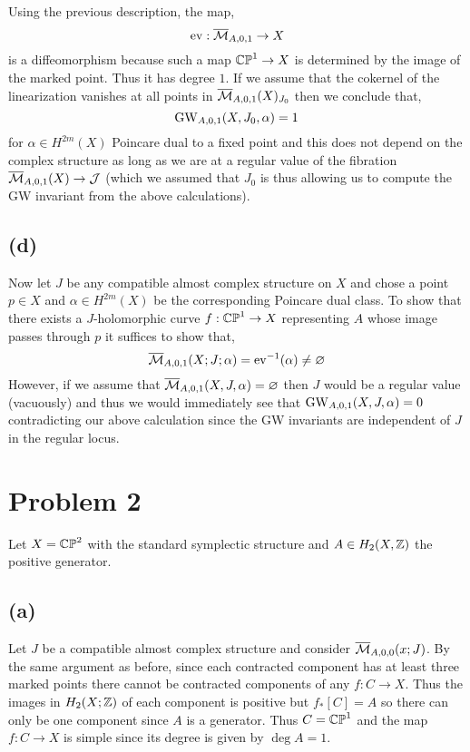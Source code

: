 \documentclass[12pt]{article}
\begin{document}
Using the previous description, the map,
\[ \mathrm{ev} : \overline{\mathcal{M}}_{A,0,1} \to X \]
is a diffeomorphism because such a map $\mathbb{CP}^1 \to X$ is determined by the image of the marked point. Thus it has degree $1$. If we assume that the cokernel of the linearization vanishes at all points in $\overline{\mathcal{M}}_{A,0,1}(X)_{J_0}$ then we conclude that,
\[ \mathrm{GW}_{A,0,1}(X, J_0, \alpha) = 1 \]
for $\alpha \in H^{2m}(X)$ Poincare dual to a fixed point and this does not depend on the complex structure as long as we are at a regular value of the fibration $\overline{\mathcal{M}}_{A,0,1}(X) \to \mathcal{J}$ (which we assumed that $J_0$ is thus allowing us to compute the GW invariant from the above calculations). 

\subsection{(d)}

Now let $J$ be any compatible almost complex structure on $X$ and chose a point $p \in X$ and $\alpha \in H^{2m}(X)$ be the corresponding Poincare dual class. To show that there exists a $J$-holomorphic curve $f : \mathbb{CP}^1 \to X$ representing $A$ whose image passes through $p$ it suffices to show that,
\[ \overline{\mathcal{M}}_{A,0,1}(X; J; \alpha) = \mathrm{ev}^{-1}(\alpha) \neq \varnothing \]
However, if we assume that $\overline{\mathcal{M}}_{A,0,1}(X, J, \alpha) = \varnothing$ then $J$ would be a regular value (vacuously) and thus we would immediately see that $\mathrm{GW}_{A,0,1}(X, J, \alpha) = 0$ contradicting our above calculation since the GW invariants are independent of $J$ in the regular locus. 

\section{Problem 2}

Let $X = \mathbb{CP}^2$ with the standard symplectic structure and $A \in H_2(X, \mathbb{Z})$ the positive generator.

\subsection{(a)}

Let $J$ be a compatible almost complex structure and consider $\overline{\mathcal{M}}_{A,0,0}(x; J)$. By the same argument as before, since each contracted component has at least three marked points there cannot be contracted components of any $f : C \to X$. Thus the images in $H_2(X; \mathbb{Z})$ of each component is positive but $f_* [C] = A$ so there can only be one component since $A$ is a generator. Thus $C = \mathbb{CP}^1$ and the map $f : C \to X$ is simple since its degree is given by $\deg{A} = 1$. 
\end{document}
